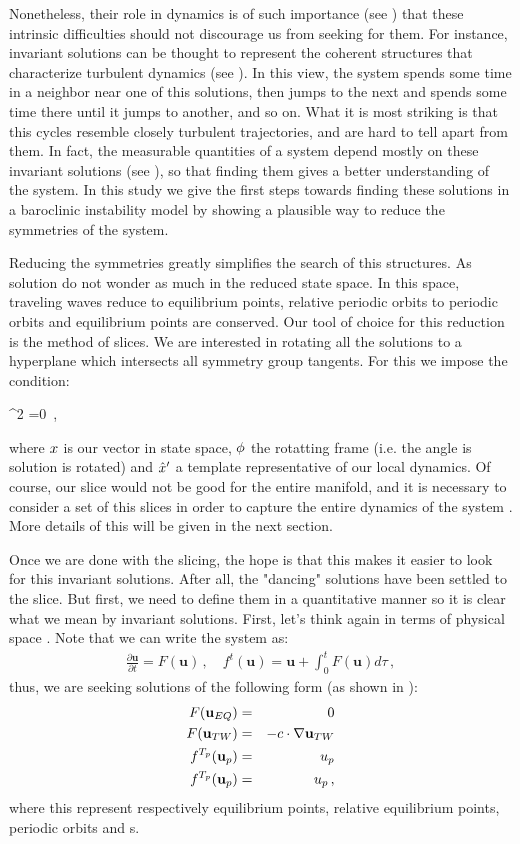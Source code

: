 Nonetheless, their role in dynamics is of such importance (see
) that these intrinsic difficulties should not
discourage us from seeking for them. For instance, invariant solutions can be thought to represent
the coherent structures that characterize turbulent dynamics (see
). In this view, the system spends some
time in a neighbor near one of this solutions, then jumps to the next and
spends some time there until it jumps to another, and so on. What it is
most striking is that this cycles resemble closely turbulent
trajectories, and are hard to tell apart from them. In fact, the
measurable quantities of a system depend mostly on these invariant
solutions (see ), so that finding them gives a better
understanding of the system. In this study we give the first steps towards
finding these solutions in a baroclinic instability model by showing a plausible way to reduce the symmetries of the system.

Reducing the symmetries greatly simplifies the search of this structures. As solution do not
wonder as much in the reduced state space. In this space, traveling waves
reduce to equilibrium points, relative periodic orbits to periodic orbits and equilibrium points
are conserved. Our tool of choice for this reduction is the method of slices. We are interested
in rotating all the solutions to a hyperplane which intersects all symmetry group tangents. For
this we impose the condition:

\beq
\frac{\partial}{\partial \gSpace} \norm{\ssp-\LieEl\slicep}^2 =0
\,,

where $\ssp$ is our vector in state space, $\gSpace$ the rotatting frame (i.e. the angle is solution is rotated) and $\slicep$ a template representative of our local dynamics. Of course, our slice would not be good for the entire manifold, and it is necessary to consider a set of this slices in order to capture the entire dynamics of the system . More details of this will be given in the next section.

Once we are done with the slicing, the hope is that this makes it easier to look for this invariant solutions. After all, the "dancing" solutions have been settled to the slice. But first, we need to define them in a quantitative manner so it is clear what we mean by invariant solutions. First, let's think again in terms of physical space . Note that we can write the system as:
\begin{eqnarray}
\frac{\partial \textbf{u}}{\partial t}
=F(\textbf{u})
    \,,\quad
f^{t}(\textbf{u})=\textbf{u}+\int_{0}^{t}{F(\textbf{u}) d \tau}
\,,
\label{NS4}
\end{eqnarray}
thus, we are seeking solutions of the following form (as shown in ):
\begin{eqnarray}
F(\textbf{u}_{EQ}) &=& 0 \nonumber \\ 
F(\textbf{u}_{TW}) &=& -c \cdot \nabla \textbf{u}_{TW} \nonumber \\ 
f^{T_p}(\textbf{u}_{p}) &=& u_p \nonumber \\ 
f^{T_p}(\textbf{u}_{p}) &=& u_p
\,,
\label{NS_Solutions}
\end{eqnarray}
where this represent respectively equilibrium points, relative equilibrium points, periodic orbits
and \rpo s.

